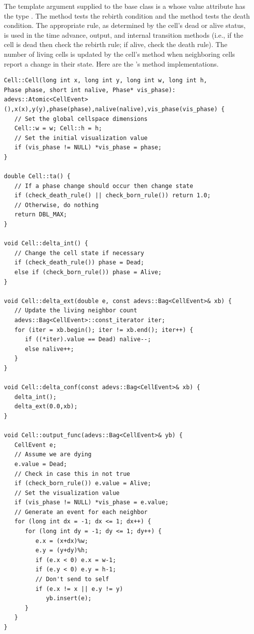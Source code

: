The template argument supplied to the base  class is a  whose value attribute has the type . The  method tests the rebirth condition and the  method tests the death condition. The appropriate rule, as determined by the cell's dead or alive status, is used in the time advance, output, and internal transition methods (i.e., if the cell is dead then check the rebirth rule; if alive, check the death rule). The number of living cells is updated by the cell's  method when neighboring cells report a change in their state. Here are the 's method implementations.
\begin{verbatim}
Cell::Cell(long int x, long int y, long int w, long int h,
Phase phase, short int nalive, Phase* vis_phase):
adevs::Atomic<CellEvent>(),x(x),y(y),phase(phase),nalive(nalive),vis_phase(vis_phase) {
   // Set the global cellspace dimensions
   Cell::w = w; Cell::h = h;
   // Set the initial visualization value
   if (vis_phase != NULL) *vis_phase = phase;
}

double Cell::ta() {
   // If a phase change should occur then change state
   if (check_death_rule() || check_born_rule()) return 1.0;
   // Otherwise, do nothing
   return DBL_MAX;
}

void Cell::delta_int() {
   // Change the cell state if necessary
   if (check_death_rule()) phase = Dead;
   else if (check_born_rule()) phase = Alive;
}

void Cell::delta_ext(double e, const adevs::Bag<CellEvent>& xb) {
   // Update the living neighbor count
   adevs::Bag<CellEvent>::const_iterator iter;
   for (iter = xb.begin(); iter != xb.end(); iter++) {
      if ((*iter).value == Dead) nalive--;
      else nalive++;
   }
}

void Cell::delta_conf(const adevs::Bag<CellEvent>& xb) {
   delta_int();
   delta_ext(0.0,xb);
}

void Cell::output_func(adevs::Bag<CellEvent>& yb) {
   CellEvent e;
   // Assume we are dying
   e.value = Dead;
   // Check in case this in not true
   if (check_born_rule()) e.value = Alive;
   // Set the visualization value
   if (vis_phase != NULL) *vis_phase = e.value;
   // Generate an event for each neighbor
   for (long int dx = -1; dx <= 1; dx++) {
      for (long int dy = -1; dy <= 1; dy++) {
         e.x = (x+dx)%w;
         e.y = (y+dy)%h;
         if (e.x < 0) e.x = w-1;
         if (e.y < 0) e.y = h-1;
         // Don't send to self
         if (e.x != x || e.y != y)
            yb.insert(e);
      }
   }
}
\end{verbatim}

